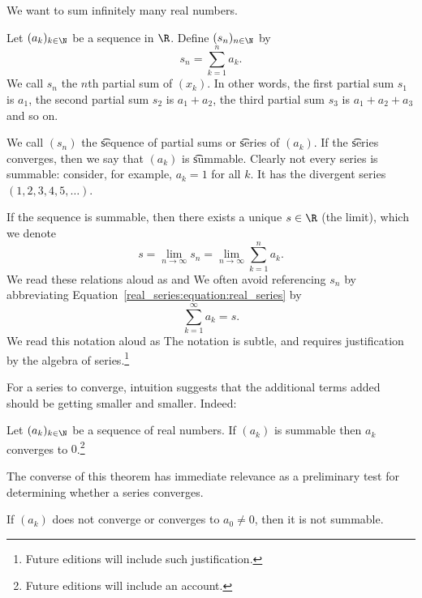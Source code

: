 

We want to sum infinitely many real numbers.


Let $(a_k)_{k \in \N}$ be a sequence in $\R$.
Define $(s_n)_{n \in \N}$ by \[s_n = \sum_{k = 1}^{n} a_k.\]
We call $s_n$ the \t{$n$th partial sum} of $(x_k)$.
In other words, the first partial sum $s_1$ is $a_1$, the second partial sum $s_2$ is $a_1 + a_2$, the third partial sum $s_3$ is $a_1 + a_2 + a_3$ and so on.

We call $(s_n)$ the \t{sequence of partial sums} or \t{series} of $(a_k)$.
If the \t{series} converges, then we say that $(a_k)$ is \t{summable}.
Clearly not every series is summable: consider, for example, $a_k = 1$ for all $k$. It has the divergent series $(1, 2, 3, 4, 5, \dots)$.



If the sequence is summable, then there exists a unique $s \in \R$ (the limit), which we denote
\begin{equation}
    s = \lim_{n\to\infty} s_n = \lim_{n\to\infty} \sum_{k = 1}^{n} a_k.
    \label{real_series:equation:real_series}
\end{equation}
We read these relations aloud as  and 
We often avoid referencing $s_n$ by abbreviating Equation~\eqref{real_series:equation:real_series} by
\[
  \sum_{k = 1}^{\infty} a_k = s.
\]
We read this notation aloud as 
The notation is subtle, and requires justification by the algebra of series.\footnote{Future editions will include such justification.}


For a series to converge, intuition suggests that the additional terms added should be getting smaller and smaller. Indeed:

\begin{proposition}
  Let $(a_k)_{k \in \N}$ be a sequence of real numbers.
  If $(a_k)$ is summable then $a_k$ converges to $0$.\footnote{Future editions will include an account.}
\end{proposition}

The converse of this theorem has immediate relevance as a preliminary test for determining whether a series converges.

\begin{proposition}
	If $(a_k)$ does not converge or converges to $a_0 \neq 0$, then it is not summable.
\end{proposition}

